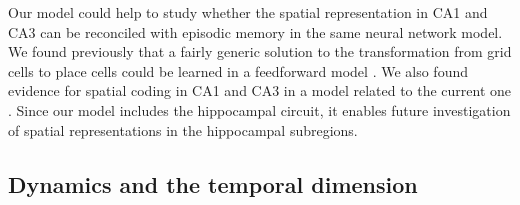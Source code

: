 \documentclass[utf8]{frontiersSCNS} %
\begin{document}
Our model could help to study whether the spatial representation in CA1 and CA3 can be reconciled with episodic memory in the same neural network model. We found previously that a fairly generic solution to the transformation from grid cells to place cells could be learned in a feedforward model \cite{cheng2011structure}. We also found evidence for spatial coding in CA1 and CA3 in a model related to the current one \cite{neher2015memory}. Since our model includes the hippocampal circuit, it enables future investigation of spatial representations in the hippocampal subregions. 




\subsection{Dynamics and the temporal dimension}  
\end{document}
